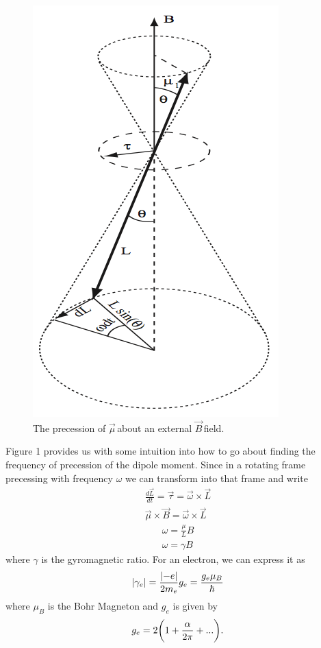 \documentclass{article}
\newcommand{\dipole}{$\vec{\mu}\,$}
\newcommand{\B}{$\vec{B}\,$}
\DeclarePairedDelimiter\abs{\lvert}{\rvert}%
\begin{document}
	\begin{figure}[!htb]
		\centering
		\includegraphics[scale=.5]{../figures/torque}
		\caption{The precession of \dipole about an external \B field.}
	\end{figure}

	Figure 1 provides us with some intuition into how to go about finding the frequency of precession of the dipole moment.  Since in a rotating frame precessing with frequency $\omega$ we can transform into that frame and write
	\begin{gather*}
		\frac{d\vec{L}}{dt} = \vec{\tau} = \vec{\omega} \times \vec{L}\\
		\vec{\mu} \times \vec{B} = \vec{\omega} \times \vec{L}
	\end{gather*}
	\begin{gather}
		\omega = \frac{\mu}{L}B\\
		\omega = \gamma B
	\end{gather}
	where $\gamma$ is the gyromagnetic ratio.  For an electron, we can express it as
	\begin{equation}
		\abs{\gamma_e} = \frac{\abs{-e}}{2m_e}g_e = \frac{g_e \mu_B}{\hbar}
	\end{equation}
	where $\mu_B$ is the Bohr Magneton and $g_e$ is given by
	\begin{equation*}
		g_e = 2\bigg{(}1+\frac{\alpha}{2\pi} + ...\bigg{)}.
	\end{equation*}

	


	
\end{document}
